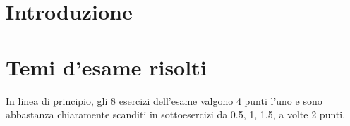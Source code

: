 \providecommand{\main}{.}



\def\reqFeaReg{Draw the feasible region in the $x_1-x_2$ axis and $f_1-f_2$.}
\newcommand{\reqParetReg}[1]{Determine the paretian region with the \textit{#1}.}
\newcommand{\reqPareStd}[1]{
	Consider the given problem of mathematical programming:
	\begin{enumerate}[a)]
		\item \reqFeaReg
		\item \reqParetReg{#1}
	\end{enumerate}
}

\newcommand{\fesReg}[1]{
	\fig{
		\texttt{[image: pareto/\#1/regx]}
		\caption{Feasible region in $x_1-x_2$}
	}{
		\texttt{[image: pareto/\#1/regf]}
		\caption{Feasible region in $f_1-f_2$}
	}[1]{\caption{Feasible regions}}
}




{\hypersetup{hidelinks}
	\tableofcontents  %
}

\chapter{Introduzione}

\clearpage

\clearpage

\clearpage

\clearpage

\clearpage

\clearpage

\clearpage

\clearpage


\appendix


\chapter{Temi d'esame risolti}

In linea di principio, gli 8 esercizi dell'esame valgono 4 punti l'uno e sono abbastanza chiaramente scanditi in sottoesercizi da 0.5, 1, 1.5, a volte 2 punti.


\clearpage

\clearpage

\clearpage

\clearpage





